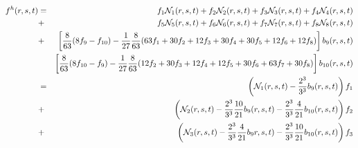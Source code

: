 \begin{eqnarray}
f^h(r,s,t) 
&=& f_1 \bN_1(r,s,t) + f_2 \bN_2(r,s,t) + f_3 \bN_3(r,s,t) + f_4 \bN_4(r,s,t) \nonumber\\
&+& f_5 \bN_5(r,s,t) + f_6 \bN_6(r,s,t) + f_7 \bN_7(r,s,t) + f_8 \bN_8(r,s,t) \nonumber\\
&+& \left[\frac{8}{63}(8{f}_{9}-{f}_{10})-\frac{1}{27}\frac{8}{63}  ( 63 f_1 +30 f_2 +12 f_3  +30f_4 +30f_5 +12f_6 +12f_8) \right] b_9(r,s,t) \nonumber\\
&&\left[ \frac{8}{63}(8 {f}_{10}-{f}_9)  -\frac{1}{27}\frac{8}{63} (12f_2 + 30f_3 + 12f_4 +12f_5 + 30f_6 + 63f_7 +30f_8) \right] b_{10}(r,s,t) \nonumber\\
&=& \left(\bN_1(r,s,t) - \frac{2^3}{3^3}b_9(r,s,t) \right) f_1 \nonumber\\
&+& \left(\bN_2(r,s,t) - \frac{2^3}{3^3}\frac{10}{21} b_9(r,s,t) - \frac{2^3}{3^3}\frac{4}{21} b_{10}(r,s,t)  \right) f_2 \nonumber\\
&+&\left( \bN_3(r,s,t)  -\frac{2^3}{3^3}\frac{4}{21} b_9r,s,t) -\frac{2^3}{3^3}\frac{10}{21} b_{10}(r,s,t)  \right)f_3 \nonumber\\

\end{eqnarray}
